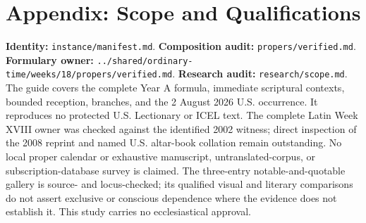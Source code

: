 \section*{Appendix: Scope and Qualifications}
\begin{studyframe}
\textbf{Identity:} \nolinkurl{instance/manifest.md}. \textbf{Composition audit:} \nolinkurl{propers/verified.md}. \textbf{Formulary owner:} \nolinkurl{../shared/ordinary-time/weeks/18/propers/verified.md}. \textbf{Research audit:} \nolinkurl{research/scope.md}. The guide covers the complete Year A formula, immediate scriptural contexts, bounded reception, branches, and the 2 August 2026 U.S. occurrence. It reproduces no protected U.S. Lectionary or ICEL text. The complete Latin Week XVIII owner was checked against the identified 2002 witness; direct inspection of the 2008 reprint and named U.S. altar-book collation remain outstanding. No local proper calendar or exhaustive manuscript, untranslated-corpus, or subscription-database survey is claimed. The three-entry notable-and-quotable gallery is source- and locus-checked; its qualified visual and literary comparisons do not assert exclusive or conscious dependence where the evidence does not establish it. This study carries no ecclesiastical approval.
\end{studyframe}

